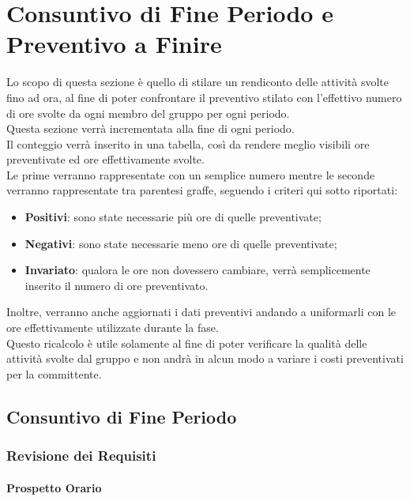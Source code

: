 \section{Consuntivo di Fine Periodo e Preventivo a Finire}
\label{CFPPAF}

Lo scopo di questa sezione è quello di stilare un rendiconto delle attività svolte fino ad ora, al fine di poter confrontare il preventivo stilato con l'effettivo numero di ore svolte da ogni membro del gruppo per ogni periodo.\\
Questa sezione verrà incrementata alla fine di ogni periodo.\\
Il conteggio verrà inserito in una tabella, così da rendere meglio visibili ore preventivate ed ore effettivamente svolte.\\
Le prime verranno rappresentate con un semplice numero mentre le seconde verranno rappresentate tra parentesi graffe, seguendo i criteri qui sotto riportati:
\begin{itemize}
	\item \textbf{Positivi}: sono state necessarie più ore di quelle preventivate;
	\item \textbf{Negativi}: sono state necessarie meno ore di quelle preventivate;
	\item \textbf{Invariato}: qualora le ore non dovessero cambiare, verrà semplicemente inserito il numero di ore preventivato.	
\end{itemize}

Inoltre, verranno anche aggiornati i dati preventivi andando a uniformarli con le ore effettivamente utilizzate durante la fase.\\
Questo ricalcolo è utile solamente al fine di poter verificare la qualità delle attività svolte dal gruppo e non andrà in alcun modo a variare i costi preventivati per la committente.

\newpage

\subsection{Consuntivo di Fine Periodo}
\label{CFP}
\subsubsection{Revisione dei Requisiti}

\paragraph{Prospetto Orario} \-\\

